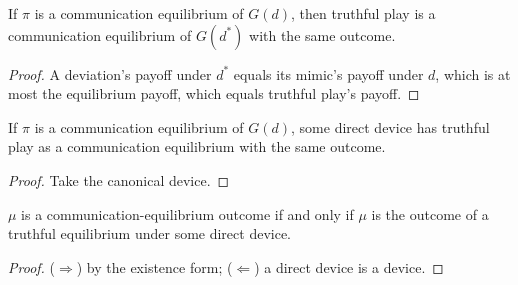\begin{theorem}
  \label{thm:revelation-canonical}
  \leanok
  If $\pi$ is a communication equilibrium of $G(d)$, then truthful play is a
  communication equilibrium of $G(d^*)$ with the same outcome.
\end{theorem}
\begin{proof}
  \leanok
  A deviation's payoff under $d^*$ equals its mimic's payoff under $d$, which
  is at most the equilibrium payoff, which equals truthful play's payoff.
\end{proof}

\begin{theorem}
  \label{thm:revelation}
  \leanok
  If $\pi$ is a communication equilibrium of $G(d)$, some direct device has
  truthful play as a communication equilibrium with the same outcome.
\end{theorem}
\begin{proof}
  \leanok
  Take the canonical device.
\end{proof}

\begin{theorem}
  \label{thm:revelation-iff}
  \leanok
  $\mu$ is a communication-equilibrium outcome if and only if $\mu$ is the
  outcome of a truthful equilibrium under some direct device.
\end{theorem}
\begin{proof}
  \leanok
  ($\Rightarrow$) by the existence form; ($\Leftarrow$) a direct device is a
  device.
\end{proof}
